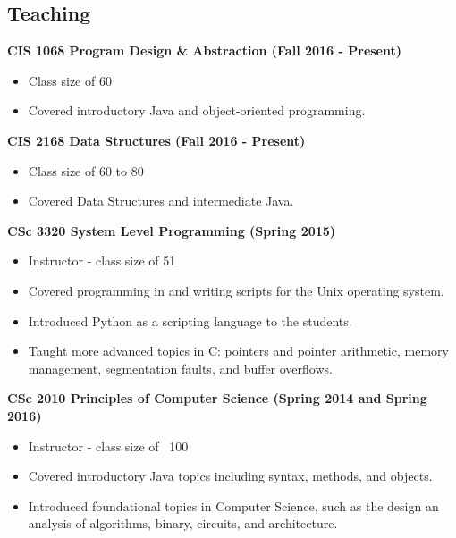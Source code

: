 \documentclass{res}
\begin{document}
\begin{resume}

\newpage
\section{Teaching}


\textbf{CIS 1068 Program Design \& Abstraction (Fall 2016 -  Present)}
\begin{itemize}
	\item Class size of 60
	\item Covered introductory Java and object-oriented programming.
\end{itemize}


\textbf{CIS 2168 Data Structures (Fall 2016 -  Present)}
\begin{itemize}
	\item Class size of 60 to 80
	\item Covered Data Structures and intermediate Java.
\end{itemize}


{\bf CSc 3320  System Level Programming (Spring 2015) }
\begin{itemize}
	\item Instructor - class size of 51
	\item Covered programming in and writing scripts for the Unix operating system.
	\item Introduced Python as a scripting language to the students.
	\item Taught more advanced topics in C: pointers and pointer arithmetic, memory management, segmentation faults, and buffer overflows.
\end{itemize}


{\bf CSc 2010 Principles of Computer Science (Spring 2014 and Spring 2016) }
\begin{itemize}
	\item Instructor - class size of ~100
	\item Covered introductory Java topics including syntax, methods, and objects.
	\item Introduced foundational topics in Computer Science, such as the design an analysis of algorithms, binary, circuits, and architecture.
\end{itemize}



\end{resume}
\end{document}
